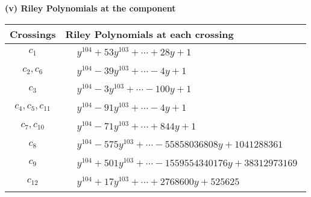 \documentclass[1p]{elsarticle_modified}
\theoremstyle{definition}
\begin{document}
\newpage\renewcommand{\arraystretch}{1}
\flushleft \textbf{(v) Riley Polynomials at the component}\newline \\
\begin{tabular}{m{50pt}|m{274pt}}
Crossings & \hspace{64pt}Riley Polynomials at each crossing \\
\hline $$\begin{aligned}c_{1}\end{aligned}$$&$\begin{aligned}
&y^{104}+53 y^{103}+\cdots+28 y+1
\end{aligned}$\\
\hline $$\begin{aligned}c_{2},c_{6}\end{aligned}$$&$\begin{aligned}
&y^{104}-39 y^{103}+\cdots-4 y+1
\end{aligned}$\\
\hline $$\begin{aligned}c_{3}\end{aligned}$$&$\begin{aligned}
&y^{104}-3 y^{103}+\cdots-100 y+1
\end{aligned}$\\
\hline $$\begin{aligned}c_{4},c_{5},c_{11}\end{aligned}$$&$\begin{aligned}
&y^{104}-91 y^{103}+\cdots-4 y+1
\end{aligned}$\\
\hline $$\begin{aligned}c_{7},c_{10}\end{aligned}$$&$\begin{aligned}
&y^{104}-71 y^{103}+\cdots+844 y+1
\end{aligned}$\\
\hline $$\begin{aligned}c_{8}\end{aligned}$$&$\begin{aligned}
&y^{104}-575 y^{103}+\cdots-55858036808 y+1041288361
\end{aligned}$\\
\hline $$\begin{aligned}c_{9}\end{aligned}$$&$\begin{aligned}
&y^{104}+501 y^{103}+\cdots-1559554340176 y+38312973169
\end{aligned}$\\
\hline $$\begin{aligned}c_{12}\end{aligned}$$&$\begin{aligned}
&y^{104}+17 y^{103}+\cdots+2768600 y+525625
\end{aligned}$\\
\hline
\end{tabular}\\~\\
\end{document}
